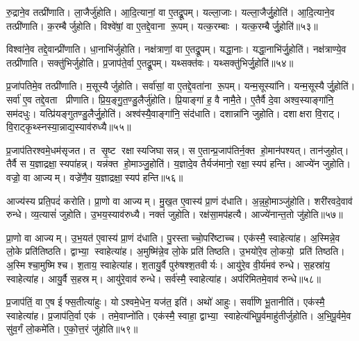 रु॒द्राने॒व तत्प्री॑णाति। ला॒जैर्जु॑होति। आ॒दि॒त्यानां॒ वा ए॒तद्रू॒पम्। यल्ला॒जाः। यल्ला॒जैर्जु॒होति॑। आ॒दि॒त्याने॒व तत्प्री॑णाति। क॒रम्बैर्जुहोति। विश्वे॑षां॒ वा ए॒तद्दे॒वाना रू॒पम्। यत्क॒रम्बाः। यत्क॒रम्बैर्जु॒होति॑॥५३॥

विश्वा॑ने॒व तद्दे॒वान्प्री॑णाति। धा॒नाभि॑र्जुहोति। नक्ष॑त्राणां॒ वा ए॒तद्रू॒पम्। यद्धा॒नाः। यद्धा॒नाभि॑र्जु॒होति॑। नक्ष॑त्राण्ये॒व तत्प्री॑णाति। सक्तु॑भिर्जुहोति। प्र॒जाप॑ते॒र्वा ए॒तद्रू॒पम्। यथ्सक्त॑वः। यथ्सक्तु॑भिर्जु॒होति॑॥५४॥

प्र॒जा॑पतिमे॒व तत्प्री॑णाति। म॒सूस्यैर्जुहोति। सर्वा॑सां॒ वा ए॒तद्दे॒वता॑ना रू॒पम्। यन्म॒सूस्या॑नि। यन्म॒सूस्यैर्जु॒होति॑। सर्वा॑ ए॒व तद्दे॒वता प्रीणाति। प्रि॒य॒ङ्गु॒त॒ण्डु॒लैर्जु॑होति। प्रि॒याङ्गा॑ ह॒ वै नामै॒ते। ए॒तैर्वै दे॒वा अश्व॒स्याङ्गा॑नि॒ सम॑दधुः। यत्प्रि॑यङ्गुतण्डु॒लैर्जु॒होति॑। अश्व॑स्यै॒वाङ्गा॑नि॒ संद॑धाति। दशान्ना॑नि जुहोति। दशाक्षरा वि॒राट्। वि॒राट्कृ॒थ्स्नस्या॒न्नाद्य॒स्याव॑रुध्यै॥५५॥\anuvakamend[जु॒होति॒ मधु॑ना जु॒होति॒ पृथु॑कैर्जु॒होति॑ क॒रम्बैर्जु॒होति॒ सक्तु॑भिर्जु॒होति॑ प्रियङ्गुतण्डु॒लैर्जु॒होति॑ च॒त्वारि॑ च (अ॒न्नहो॒मानाज्ये॑ना॒ग्नेर्मधु॑ना तण़्डु॒लैः पृथु॑कैर्ला॒जैः क॒रम्बैर्धा॒नाभि॒स्सक्तु॑भिर्म॒सूस्यै प्रियङ्गुतण्डु॒लैर्द॒शान्ना॑नि॒ द्वाद॑श। )]

प्र॒जाप॑तिरश्वमे॒धम॑सृजत। त सृ॒ष्ट रक्षास्यजिघासन्न्। स ए॒तान्प्र॒जाप॑तिर्न॒क्त हो॒मान॑पश्यत्। तान॑जुहोत्। तैर्वै स य॒ज्ञाद्रक्षा॒स्यपा॑हन्न्। यन्न॑क्त हो॒माञ्जु॒होति॑। य॒ज्ञादे॒व तैर्यज॑मानो॒ रक्षा॒स्यप॑ हन्ति। आज्ये॑न जुहोति। वज्रो॒ वा आज्यम्। वज्रे॑णै॒व य॒ज्ञाद्रक्षा॒स्यप॑ हन्ति॥५६॥

आज्य॑स्य प्रति॒पदं॑ करोति। प्रा॒णो वा आज्यम्। मु॒ख॒त ए॒वास्य॑ प्रा॒णं द॑धाति। अ॒न्न॒हो॒माञ्जु॑होति। शरी॑रवदे॒वाव॑ रुन्धे। व्य॒त्यासं॑ जुहोति। उ॒भय॒स्याव॑रुध्यै। नक्तं॑ जुहोति। रक्ष॑सा॒मप॑हत्यै। आज्ये॑नान्त॒तो जु॑होति॥५७॥

प्रा॒णो वा आज्यम्। उ॒भ॒यत॑ ए॒वास्य॑ प्रा॒णं द॑धाति। पु॒रस्ताच्चो॒परि॑ष्टाच्च। एक॑स्मै॒ स्वाहेत्या॑ह। अ॒स्मिन्ने॒व लो॒के प्रति॑तिष्ठति। द्वाभ्या॒ स्वाहेत्या॑ह। अ॒मुष्मि॑न्ने॒व लो॒के प्रति॑ तिष्ठति। उ॒भयो॑रे॒व लो॒कयो॒ प्रति॑ तिष्ठति। अ॒स्मिश्चा॒मुष्मिश्च। श॒ताय॒ स्वाहेत्या॑ह। श॒तायु॒र्वै पुरु॑षश्श॒तवीर्यः। आयु॑रे॒व वी॒र्य॑मव॑ रुन्धे। स॒हस्रा॑य॒ स्वाहेत्या॑ह। आयु॒र्वै स॒हस्रम्। आयु॑रे॒वाव॑ रुन्धे। सर्व॑स्मै॒ स्वाहेत्या॑ह। अप॑रिमितमे॒वाव॑ रुन्धे॥५८॥\anuvakamend[ए॒व य॒ज्ञाद्रक्षा॒स्यप॑हन्त्यन्त॒तो जु॑होति श॒ताय॒ स्वाहेत्या॑ह स॒प्त च॑]

प्र॒जाप॑तिं॒ वा ए॒ष ईफ्स॒तीत्या॑हुः। योऽश्वमे॒धेन॒ यज॑त॒ इति॑। अथो॑ आहुः। सर्वा॑णि भू॒तानीति॑। एक॑स्मै॒ स्वाहेत्या॑ह। प्र॒जाप॑ति॒र्वा एक॑। तमे॒वाप्नो॑ति। एक॑स्मै॒ स्वाहा॒ द्वाभ्या॒ स्वाहेत्य॑भिपू॒र्वमाहु॑तीर्जुहोति। अ॒भि॒पू॒र्वमे॒व सु॑व॒र्गं लो॒कमे॑ति। ए॒को॒त्त॒रं जु॑होति॥५९॥

